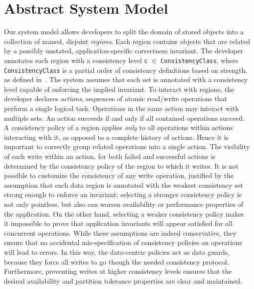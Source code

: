 \documentclass[preprint,numbers]{sigplanconf}
\begin{document}

\section{Abstract System Model}
Our system model allows developers to split the domain of stored objects into a
collection of named, disjoint
\emph{regions}. Each
region contains objects that are related by a possibly unstated,
application-specific correctness invariant. The
developer annotates each region with a consistency level \texttt{c} $\in$
\texttt{ConsistencyClass}, where \texttt{ConsistencyClass} is a partial order
of consistency definitions based on strength, as defined
in~\cite{sivaramakrishnan2015declarative}. The system assumes that each
set is annotated with a consistency level capable of
enforcing the implied invariant. To interact with regions, the developer
declares \emph{actions}, sequences of atomic
read/write operations that perform a single logical task.
Operations in the same action may interact with multiple sets. An action succeeds if and only if
all contained operations succeed. A consistency policy of a region applies
\emph{only} to all operations within actions interacting with it, as opposed to a complete
history of actions.  Hence it is important to
correctly group related operations into a single action.
The visibility
of each write within an action, for both failed and successful
actions is determined by the consistency policy of the region to which it writes.
It is not possible to customize the consistency of any write operation, justified
by the assumption that each data region is annotated with the weakest
consistency set strong enough to enforce an invariant; selecting a stronger
consistency policy is not only pointless, but also can worsen
availability or performance properties of the application. On the other hand,
selecting a weaker consistency policy makes it impossible to prove that
application invariants will appear satisfied for all concurrent operations.
While these assumptions are indeed conservative, they ensure that no accidental
mis-specification of consistency policies on operations will lead to errors. In this way, the
data-centric policies act as data guards, because they force all writes to go
though the needed consistency protocol. Furthermore, preventing writes at higher
consistency levels ensures that the desired availability and partition tolerance
properties are clear and maintained. 
\end{document}
